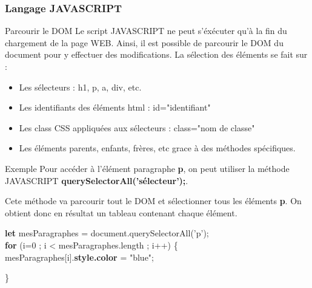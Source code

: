 \documentclass[8pt]{beamer}
\begin{document}
\begin{frame}
\frametitle{Langage JAVASCRIPT}

\begin{block}{Parcourir le DOM}
Le script JAVASCRIPT ne peut s'éxécuter qu'à la fin du chargement de la page WEB. Ainsi, il est possible de parcourir le DOM du document pour y effectuer des modifications. La sélection des éléments se fait sur :
\begin{itemize}
\item Les sélecteurs : h1, p, a, div, etc.
\item Les identifiants des éléments html : id="identifiant"
\item Les class CSS appliquées aux sélecteurs : class="nom de classe"
\item Les éléments parents, enfants, frères, etc grace à des méthodes spécifiques.
\end{itemize} 
\end{block}

\begin{exampleblock}{Exemple}
Pour accéder à l'élément paragraphe \textbf{p}, on peut utiliser la méthode JAVASCRIPT
\textbf{querySelectorAll('sélecteur');}.\smallskip

Cete méthode va parcourir tout le DOM et sélectionner tous les éléments \textbf{p}. On obtient donc en résultat un tableau contenant chaque élément.\medskip

\hspace{0.5cm}\textbf{let} mesParagraphes = document.querySelectorAll('p');\\

\hspace{0.5cm}\textbf{for} (i=0 ; i < mesParagraphes.length ; i++) \{\\

\hspace{1cm}mesParagraphes[i].\textbf{style.color} = "blue";

\hspace{0.5cm}\}

\end{exampleblock}
\end{frame}
\end{document}
